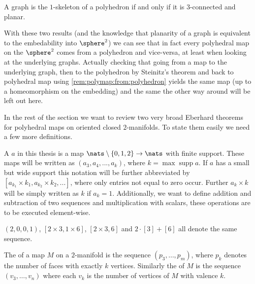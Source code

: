 \begin{theorem} A graph is the $1$-skeleton of a polyhedron if and only if it is $3$-connected and planar.
\end{theorem}

With these two results (and the knowledge that planarity of a graph is equivalent to the embedability into $\sphere^2$) we can see that in fact every polyhedral map on the $\sphere^2$ comes from a polyhedron and vice-versa, at least when looking at the underlying graphs. Actually checking that going from a map to the underlying graph, then to the polyhedron by {\sc Steinitz's} theorem and back to polyhedral map using \autoref{rem:polymap:from:polyhedron} yields the same map (up to a homeomorphism on the embedding) and the same the other way around will be left out here.

In the rest of the section we want to review two very broad {\sc Eberhard} theorems for polyhedral maps on oriented closed $2$-manifolds. To state them easily we need a few more definitions.

\begin{definition}[Sequence]
  A  $a$ in this thesis is a map $\nats \setminus \{0, 1, 2\} \rightarrow \nats$ with finite support. These maps will be written as $(a_3, a_4, ..., a_k)$, where $k = \operatorname{max} \operatorname{supp} a$. If $a$ has a small but wide support this notation will be further abbreviated by $[a_{k_1} \times k_1, a_{k_2} \times k_2, ...]$, where only entries not equal to zero occur. Further $a_k \times k$ will be simply written as $k$ if $a_k = 1$. Additionally, we want to define addition and subtraction of two sequences and multiplication with scalars, these operations are to be executed element-wise.
\end{definition}
\begin{example}
  $(2, 0, 0, 1)$, $[2 \times 3, 1 \times 6]$, $[2 \times 3, 6]$ and $2 \cdot [3] + [6]$ all denote the same sequence.
\end{example}
\begin{definition}\label{def:relizable}
  The  of a map $M$ on a $2$-manifold is the sequence $(p_3, \dots, p_m)$, where $p_k$ denotes the number of faces with exactly $k$ vertices. Similarly the  of $M$ is the sequence $(v_3, \dots, v_n)$ where each $v_k$ is the number of vertices of $M$ with valence $k$.
\end{definition}

